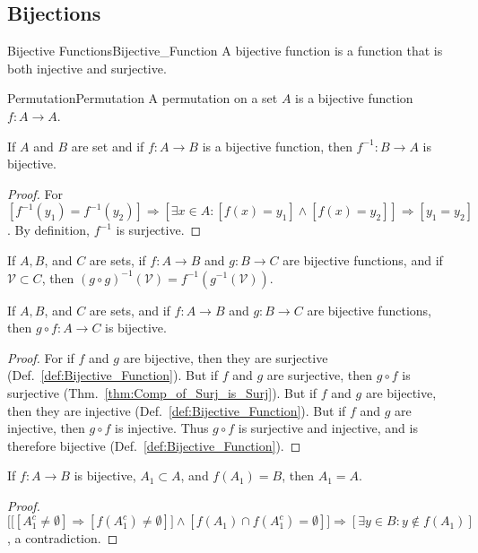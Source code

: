     \subsection{Bijections}
        \begin{fdefinition}{Bijective Functions}{Bijective_Function}
            A \gls{bijective function} is a function that is both injective and
            surjective.
        \end{fdefinition}
        \begin{fdefinition}{Permutation}{Permutation}
            A \gls{permutation} on a \gls{set} $A$ is a \gls{bijective function}
            $f:A\rightarrow{A}$.
        \end{fdefinition}
        \begin{theorem}
            If $A$ and $B$ are set and if $f:A\rightarrow B$ is a bijective
            function, then $f^{\minus{1}}:B\rightarrow{A}$ is bijective.
        \end{theorem}
        \begin{proof}
            For $[f^{-1}(y_1) = f^{-1}(y_2)]\Rightarrow [\exists x\in A:[f(x) = y_1]\land [f(x)=y_2]]\Rightarrow [y_1=y_2]$. By definition, $f^{-1}$ is surjective.
        \end{proof}
        \begin{theorem}
            If $A,B$, and $C$ are sets, if $f:A\rightarrow{B}$ and
            $g:B\rightarrow{C}$ are bijective functions, and if
            $\mathcal{V}\subset{C}$, then
            $(g\circ g)^{-1}(\mathcal{V})=f^{-1}(g^{-1}(\mathcal{V}))$.
        \end{theorem}
        \begin{theorem}
            If $A,B$, and $C$ are sets, and if $f:A\rightarrow{B}$ and
            $g:B\rightarrow{C}$ are bijective functions, then
            $g\circ{f}:A\rightarrow{C}$ is bijective.
        \end{theorem}
        \begin{proof}
            For if $f$ and $g$ are bijective, then they are surjective
            (Def.~\ref{def:Bijective_Function}). But if $f$ and $g$ are
            surjective, then $g\circ{f}$ is surjective
            (Thm.~\ref{thm:Comp_of_Surj_is_Surj}). But if $f$ and $g$ are
            bijective, then they are injective
            (Def.~\ref{def:Bijective_Function}). But if $f$ and $g$ are
            injective, then $g\circ{f}$ is injective. Thus $g\circ{f}$ is
            surjective and injective, and is therefore bijective
            (Def.~\ref{def:Bijective_Function}).
        \end{proof}
        \begin{theorem}
        If $f:A\rightarrow B$ is bijective, $A_1\subset A$, and $f(A_1) = B$, then $A_1=A$.
        \end{theorem}
        \begin{proof}
        $\Big[\big[[A_1^c \ne \emptyset]\Rightarrow [f(A_1^c) \ne \emptyset]\big]\land[f(A_1)\cap f(A_1^c) = \emptyset]\Big]\Rightarrow [\exists y\in B:y\notin f(A_1)]$, a contradiction.
        \end{proof}
